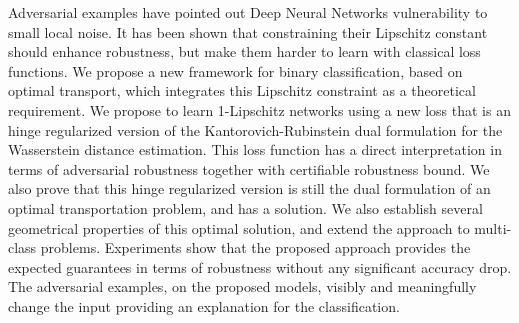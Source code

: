 
Adversarial examples have pointed out Deep Neural Networks vulnerability to small local noise. It has been shown that constraining their Lipschitz constant should enhance robustness, but make them harder to learn with classical loss functions. We propose a new framework for binary classification, based on optimal transport, which integrates this Lipschitz constraint as a theoretical requirement. We propose to learn 1-Lipschitz networks using a new loss that is an hinge regularized version of the Kantorovich-Rubinstein dual formulation for the Wasserstein distance estimation. This loss function has a direct interpretation in terms of adversarial robustness together with certifiable robustness bound. We also prove that this hinge regularized version is still the dual formulation of an optimal transportation problem, and has a solution. We also establish several geometrical properties of this optimal solution, and extend the approach to multi-class problems. Experiments show that the proposed approach provides the expected guarantees in terms of robustness without any significant accuracy drop. The adversarial examples, on the proposed models, visibly and meaningfully change the input providing an explanation for the classification.





